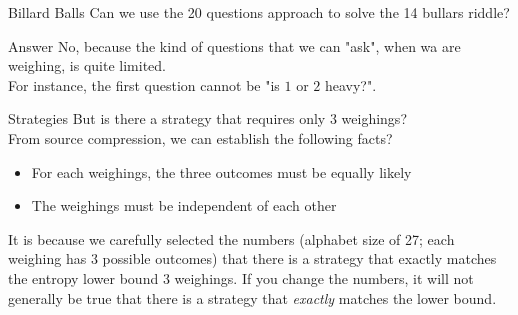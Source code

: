 
\begin{parag}{Billard Balls}
    Can we use the 20 questions approach to solve the 14 bullars riddle?
    \begin{subparag}{Answer}
        No, because the kind of questions that we can "ask", when wa are weighing, is quite limited.\\
        For instance, the first question cannot be "is $1$ or $2$ heavy?".
        
    \end{subparag}

\end{parag}
\begin{parag}{Strategies}
    But is there a strategy that requires only $3$ weighings?
    \\
    From source compression, we can establish the following facts?
    \begin{itemize}
        \item For each weighings, the three outcomes must be equally likely
        \item The weighings must be independent of each other
    \end{itemize}
    \begin{framedremark}
        It is because we carefully selected the numbers (alphabet size of 27; each weighing has $3$ possible outcomes) that there is a strategy that exactly matches the entropy lower bound $3$ weighings. If you change the numbers, it will not generally be true that there is a strategy that \textit{exactly} matches the lower bound.
    \end{framedremark}
\end{parag}
